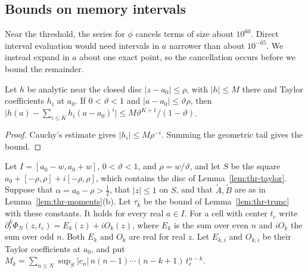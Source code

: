 \subsection{Bounds on memory intervals}

Near the threshold, the series for $\phi$ cancels terms of size
about $10^{60}$. Direct interval evaluation would need intervals
in $a$ narrower than about $10^{-65}$. We instead expand in $a$
about one exact point, so the cancellation occurs before we bound
the remainder.

\begin{lemma}\label{lem:thr-taylor}
Let $h$ be analytic near the closed disc $\lvert z-a_0\rvert\le\rho$, with
$\lvert h\rvert\le M$ there and Taylor coefficients $h_i$ at $a_0$. If $0<\vartheta<1$
and $\lvert a-a_0\rvert\le \vartheta\rho$, then
$\lvert h(a)-\sum_{i\le K}h_i(a-a_0)^i\rvert\le M\vartheta^{K+1}/(1-\vartheta)$.
\end{lemma}

\begin{proof}
Cauchy's estimate gives $\lvert h_i\rvert\le M\rho^{-i}$. Summing the geometric
tail gives the bound.
\end{proof}

Let $I=[a_0-w,a_0+w]$, $0<\vartheta<1$, and $\rho=w/\vartheta$, and let $S$ be the square
$a_0+[-\rho,\rho]+i[-\rho,\rho]$, which contains the disc of
Lemma~\ref{lem:thr-taylor}. Suppose that $\alpha=a_0-\rho>\frac12$, that
$\lvert z\rvert\le1$ on $S$, and that $\tilde A,\tilde B$ are as in
Lemma~\ref{lem:thr-moments}(b). Let $\tau_k$ be the bound of
Lemma~\ref{lem:thr-trunc} with these constants. It holds for every real
$a\in I$. For a cell with center $t_c$ write
$\partial_t^k\Phi_N(z,t_c)=E_k(z)+iO_k(z)$, where $E_k$ is the sum over even
$n$ and $iO_k$ the sum over odd $n$. Both $E_k$ and $O_k$ are real for real
$z$. Let $E_{k,i}$ and $O_{k,i}$ be their Taylor coefficients at $a_0$, and
put $M_k=\sum_{n\le N}\sup_S\lvert c_n\rvert\,n(n-1)\cdots(n-k+1)\,t_c^{n-k}$.

